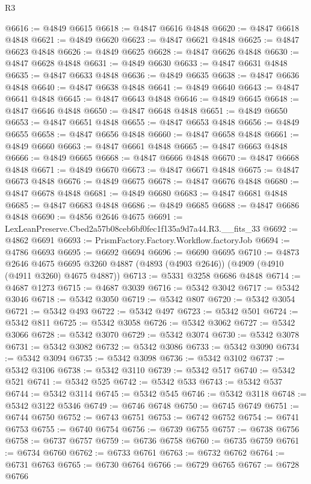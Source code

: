 \begin{lexlean}{R3}
\begin{coremodule}
@6616 := @4849 @6615
@6618 := @4847 @6616 @4848
@6620 := @4847 @6618 @4848
@6621 := @4849 @6620
@6623 := @4847 @6621 @4848
@6625 := @4847 @6623 @4848
@6626 := @4849 @6625
@6628 := @4847 @6626 @4848
@6630 := @4847 @6628 @4848
@6631 := @4849 @6630
@6633 := @4847 @6631 @4848
@6635 := @4847 @6633 @4848
@6636 := @4849 @6635
@6638 := @4847 @6636 @4848
@6640 := @4847 @6638 @4848
@6641 := @4849 @6640
@6643 := @4847 @6641 @4848
@6645 := @4847 @6643 @4848
@6646 := @4849 @6645
@6648 := @4847 @6646 @4848
@6650 := @4847 @6648 @4848
@6651 := @4849 @6650
@6653 := @4847 @6651 @4848
@6655 := @4847 @6653 @4848
@6656 := @4849 @6655
@6658 := @4847 @6656 @4848
@6660 := @4847 @6658 @4848
@6661 := @4849 @6660
@6663 := @4847 @6661 @4848
@6665 := @4847 @6663 @4848
@6666 := @4849 @6665
@6668 := @4847 @6666 @4848
@6670 := @4847 @6668 @4848
@6671 := @4849 @6670
@6673 := @4847 @6671 @4848
@6675 := @4847 @6673 @4848
@6676 := @4849 @6675
@6678 := @4847 @6676 @4848
@6680 := @4847 @6678 @4848
@6681 := @4849 @6680
@6683 := @4847 @6681 @4848
@6685 := @4847 @6683 @4848
@6686 := @4849 @6685
@6688 := @4847 @6686 @4848
@6690 := @4856 @2646 @4675
@6691 := LexLeanPreserve.Cbed2a57b08ceb6bf0fec1f135a9d7a44.R3.__fits_33
@6692 := @4862 @6691
@6693 := PrismFactory.Factory.Workflow.factoryJob
@6694 := @4786 @6693
@6695 := @6692 @6694
@6696 := @6690 @6695
@6710 := @4873
    @2646
    @4675
    @6695
    @3260
    @4887
    (@4893 (@4903 @2646))
    (@4909 (@4910 (@4911 @3260) @4675 @4887))
@6713 := @5331 @3258 @6686 @4848
@6714 := @4687 @1273
@6715 := @4687 @3039
@6716 := @5342 @3042
@6717 := @5342 @3046
@6718 := @5342 @3050
@6719 := @5342 @807
@6720 := @5342 @3054
@6721 := @5342 @493
@6722 := @5342 @497
@6723 := @5342 @501
@6724 := @5342 @811
@6725 := @5342 @3058
@6726 := @5342 @3062
@6727 := @5342 @3066
@6728 := @5342 @3070
@6729 := @5342 @3074
@6730 := @5342 @3078
@6731 := @5342 @3082
@6732 := @5342 @3086
@6733 := @5342 @3090
@6734 := @5342 @3094
@6735 := @5342 @3098
@6736 := @5342 @3102
@6737 := @5342 @3106
@6738 := @5342 @3110
@6739 := @5342 @517
@6740 := @5342 @521
@6741 := @5342 @525
@6742 := @5342 @533
@6743 := @5342 @537
@6744 := @5342 @3114
@6745 := @5342 @545
@6746 := @5342 @3118
@6748 := @5342 @3122 @5346
@6749 := @6746 @6748
@6750 := @6745 @6749
@6751 := @6744 @6750
@6752 := @6743 @6751
@6753 := @6742 @6752
@6754 := @6741 @6753
@6755 := @6740 @6754
@6756 := @6739 @6755
@6757 := @6738 @6756
@6758 := @6737 @6757
@6759 := @6736 @6758
@6760 := @6735 @6759
@6761 := @6734 @6760
@6762 := @6733 @6761
@6763 := @6732 @6762
@6764 := @6731 @6763
@6765 := @6730 @6764
@6766 := @6729 @6765
@6767 := @6728 @6766

\end{coremodule}
\end{lexlean}
